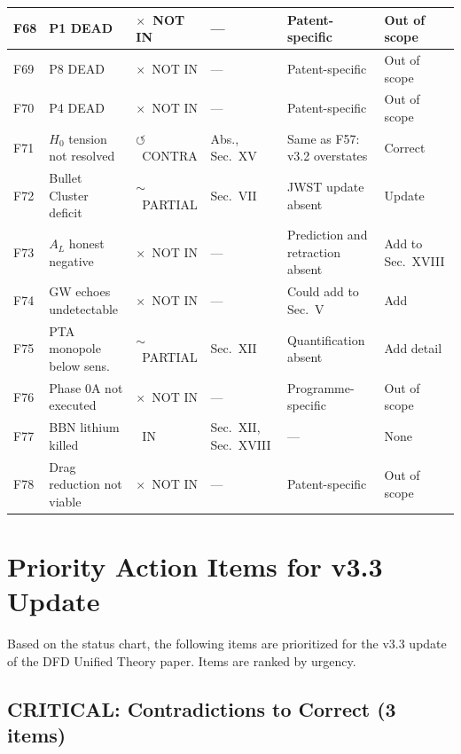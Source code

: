 \documentclass[11pt,a4paper]{article}
\newcommand{\vin}{\textcolor{statusIN}{\checkmark~IN}}
\newcommand{\vpartial}{\textcolor{statusPARTIAL}{$\sim$~PARTIAL}}
\newcommand{\vnot}{\textcolor{statusNOT}{$\times$~NOT IN}}
\newcommand{\vcontra}{\textcolor{statusCONTRA}{$\circlearrowleft$~CONTRA}}
\begin{document}
{\begin{longtable}{|p{0.5cm}|p{4.8cm}|p{1.6cm}|p{2.5cm}|p{4.5cm}|p{1.8cm}|}
\rowcolor{negative!8}
F68 & P1 DEAD & \vnot & --- & Patent-specific & Out of scope \\
\hline
\rowcolor{negative!8}
F69 & P8 DEAD & \vnot & --- & Patent-specific & Out of scope \\
\hline
\rowcolor{negative!8}
F70 & P4 DEAD & \vnot & --- & Patent-specific & Out of scope \\
\hline
\rowcolor{negative!8}
F71 & $H_0$ tension not resolved & \vcontra & Abs., Sec.~XV & Same as F57: v3.2 overstates & Correct \\
\hline
\rowcolor{negative!8}
F72 & Bullet Cluster deficit & \vpartial & Sec.~VII & JWST update absent & Update \\
\hline
\rowcolor{negative!8}
F73 & $A_L$ honest negative & \vnot & --- & Prediction and retraction absent & Add to Sec.~XVIII \\
\hline
\rowcolor{negative!8}
F74 & GW echoes undetectable & \vnot & --- & Could add to Sec.~V & Add \\
\hline
\rowcolor{negative!8}
F75 & PTA monopole below sens. & \vpartial & Sec.~XII & Quantification absent & Add detail \\
\hline
\rowcolor{negative!8}
F76 & Phase 0A not executed & \vnot & --- & Programme-specific & Out of scope \\
\hline
\rowcolor{negative!8}
F77 & BBN lithium killed & \vin & Sec.~XII, Sec.~XVIII & --- & None \\
\hline
\rowcolor{negative!8}
F78 & Drag reduction not viable & \vnot & --- & Patent-specific & Out of scope \\
\hline

\end{longtable}
}


\section{Priority Action Items for v3.3 Update}\label{sec:actions}

Based on the status chart, the following items are prioritized for the v3.3 update of the DFD Unified Theory paper. Items are ranked by urgency.

\subsection{CRITICAL: Contradictions to Correct (3 items)}
\end{document}
